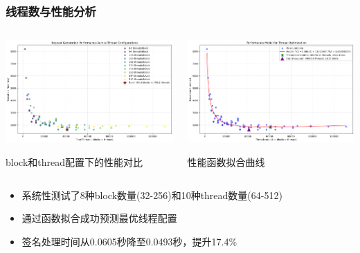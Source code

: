 \documentclass[slide]{../../custom}
\begin{document}
\begin{frame}
  \frametitle{线程数与性能分析}
  \begin{columns}
    \begin{column}{0.48\textwidth}
      \includegraphics[width=\textwidth]{./fig/thread_time_cost.png}
      \centerline{block和thread配置下的性能对比}
    \end{column}
    \hfill
    \begin{column}{0.48\textwidth}
      \includegraphics[width=\textwidth]{./fig/approach.png}
      \centerline{性能函数拟合曲线}
    \end{column}
  \end{columns}
  \vspace{0.5cm}
  \begin{itemize}
    \item 系统性测试了8种block数量(32-256)和10种thread数量(64-512)
    \item 通过函数拟合成功预测最优线程配置
    \item 签名处理时间从0.0605秒\cite{Wang2025}降至0.0493秒，提升17.4\%
  \end{itemize}
\end{frame}
\end{document}
